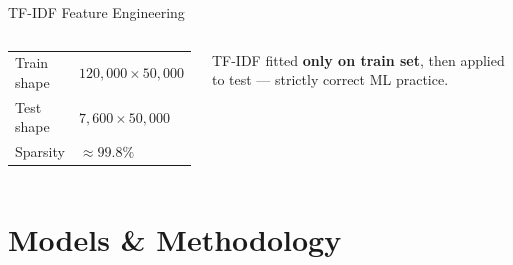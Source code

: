 \documentclass[aspectratio=169,11pt]{beamer}
\begin{document}
\begin{frame}{TF-IDF Feature Engineering}
\begin{columns}[T]
\begin{tcolorbox}[colback=light,colframe=primary,title=Matrix Properties,fonttitle=\footnotesize\bfseries]
      \footnotesize
      \begin{tabular}{ll}
        Train shape & $120{,}000 \times 50{,}000$ \\
        Test shape  & $7{,}600   \times 50{,}000$ \\
        Sparsity    & $\approx 99.8\%$ \\
      \end{tabular}
    \end{tcolorbox}
    \begin{tcolorbox}[colback=greencol!8,colframe=greencol,fonttitle=\footnotesize\bfseries,title=No Data Leakage!]
      \footnotesize
      TF-IDF fitted \textbf{only on train set}, then applied to test --- strictly correct ML practice.
    \end{tcolorbox}
\end{columns}
\end{frame}

\section{Models \& Methodology}
\end{document}
